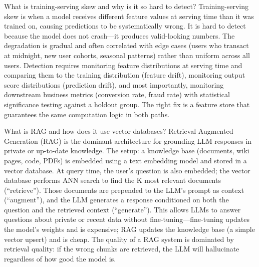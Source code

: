 \documentclass[11pt,a4paper]{article}
\begin{document}
\begin{curiobox}{What is training-serving skew and why is it so hard to detect?}
Training-serving skew is when a model receives different feature values at serving time than it was trained on, causing predictions to be systematically wrong. It is hard to detect because the model does not crash---it produces valid-looking numbers. The degradation is gradual and often correlated with edge cases (users who transact at midnight, new user cohorts, seasonal patterns) rather than uniform across all users. Detection requires monitoring feature distributions at serving time and comparing them to the training distribution (feature drift), monitoring output score distributions (prediction drift), and most importantly, monitoring downstream business metrics (conversion rate, fraud rate) with statistical significance testing against a holdout group. The right fix is a feature store that guarantees the same computation logic in both paths.
\end{curiobox}

\begin{curiobox}{What is RAG and how does it use vector databases?}
Retrieval-Augmented Generation (RAG) is the dominant architecture for grounding LLM responses in private or up-to-date knowledge. The setup: a knowledge base (documents, wiki pages, code, PDFs) is embedded using a text embedding model and stored in a vector database. At query time, the user's question is also embedded; the vector database performs ANN search to find the K most relevant documents (``retrieve''). Those documents are prepended to the LLM's prompt as context (``augment''), and the LLM generates a response conditioned on both the question and the retrieved context (``generate''). This allows LLMs to answer questions about private or recent data without fine-tuning---fine-tuning updates the model's weights and is expensive; RAG updates the knowledge base (a simple vector upsert) and is cheap. The quality of a RAG system is dominated by retrieval quality: if the wrong chunks are retrieved, the LLM will hallucinate regardless of how good the model is.
\end{curiobox}
\end{document}
